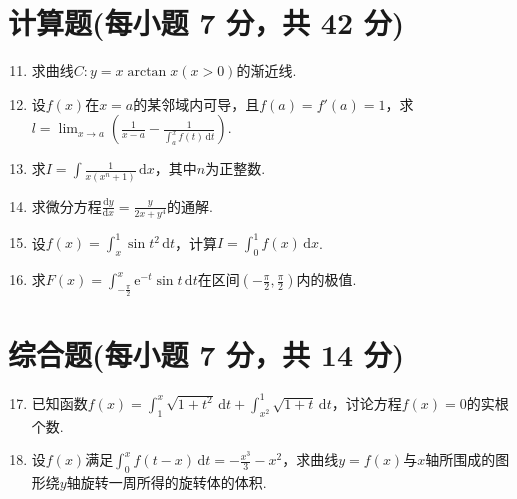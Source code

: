 \documentclass[../main.tex]{subfiles}
\begin{document}
\section{计算题(每小题 7 分，共 42 分)}
\begin{enumerate}
    \setcounter{enumi}{10}
    \item 求曲线$C:y=x\arctan x(x>0)$的渐近线.
          \vspace{12em}

    \item 设$f(x)$在$x=a$的某邻域内可导，且$f(a)=f'(a)=1$，求$l=\lim_{x\to a}
              \left(\frac{1}{x-a}-\frac{1}{\displaystyle\int_{a}^{x}f(t)\,\mathrm{d}t}\right
              )$.
          \vspace{12em}

    \item 求$I=\int\frac{1}{x(x^{n}+1)}\,\mathrm{d}x$，其中$n$为正整数.
          \vspace{12em}

    \item 求微分方程$\frac{\mathrm{d}y}{\mathrm{d}x}=\frac{y}{2x+y^{4}}$的通解.
          \vspace{12em}

    \item 设$f(x)=\int_{x}^{1}\sin t^{2}\,\mathrm{d}t$，计算$I=\int_{0}^{1}f(x
              )\,\mathrm{d}x$.
          \vspace{12em}

    \item 求$F(x)=\int_{-\frac{\pi}{2}}^{x}\mathrm{e}^{-t}\sin t\,\mathrm{d}t$在区间$\left
              (-\frac{\pi}{2},\frac{\pi}{2}\right)$内的极值.
          \vspace{12em}
\end{enumerate}

\section{综合题(每小题 7 分，共 14 分)}
\begin{enumerate}
    \setcounter{enumi}{16}
    \item 已知函数$f(x)=\int_{1}^{x}\sqrt{1+t^{2}}\,\mathrm{d}t+\int_{x^2}^{1}
              \sqrt{1+t}\,\mathrm{d}t$，讨论方程$f(x)=0$的实根个数.
          \vspace{9em}

    \item 设$f(x)$满足$\int_{0}^{x}f(t-x)\,\mathrm{d}t=-\frac{x^{3}}{3}-x^{2}$，求曲线$y
              =f(x)$与$x$轴所围成的图形绕$y$轴旋转一周所得的旋转体的体积.
          \vspace{9em}
\end{enumerate}
\end{document}
